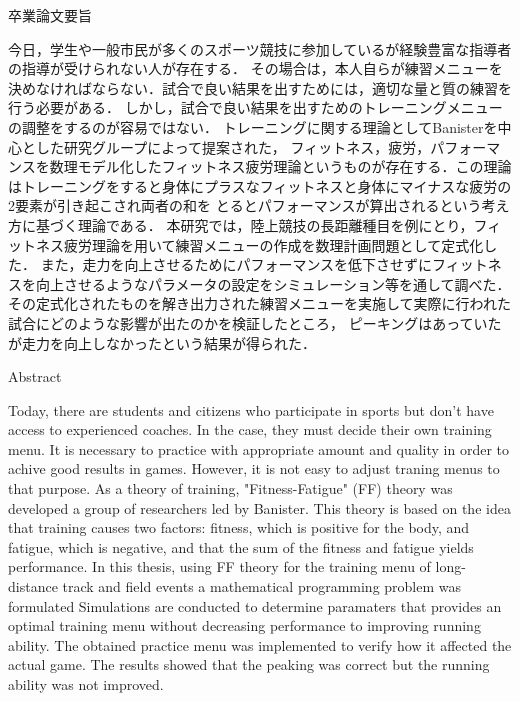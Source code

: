 \documentclass[12pt,fleqn]{jreport}
\begin{document}
\begin{center}
  {\huge 卒業論文要旨}
\end{center}
\vspace{3cm}
\large
今日，学生や一般市民が多くのスポーツ競技に参加しているが経験豊富な指導者の指導が受けられない人が存在する．
その場合は，本人自らが練習メニューを決めなければならない．試合で良い結果を出すためには，適切な量と質の練習を行う必要がある．
しかし，試合で良い結果を出すためのトレーニングメニューの調整をするのが容易ではない．
トレーニングに関する理論としてBanisterを中心とした研究グループによって提案された，
フィットネス，疲労，パフォーマンスを数理モデル化したフィットネス疲労理論というものが存在する．この理論
はトレーニングをすると身体にプラスなフィットネスと身体にマイナスな疲労の2要素が引き起こされ両者の和を
とるとパフォーマンスが算出されるという考え方に基づく理論である．
本研究では，陸上競技の長距離種目を例にとり，フィットネス疲労理論を用いて練習メニューの作成を数理計画問題として定式化した．
また，走力を向上させるためにパフォーマンスを低下させずにフィットネスを向上させるようなパラメータの設定をシミュレーション等を通して調べた．
その定式化されたものを解き出力された練習メニューを実施して実際に行われた試合にどのような影響が出たのかを検証したところ，
ピーキングはあっていたが走力を向上しなかったという結果が得られた．
\newpage
\thispagestyle{empty}

\begin{center}
  {\huge Abstract}
\end{center}
\vspace{3cm}
Today, there are students and citizens who participate in sports but don't have access to experienced coaches.
In the case, they must decide their own training menu.
It is necessary to practice with appropriate amount and quality in order to achive good results in games.
However, it is not easy to adjust traning menus to that purpose.
As a theory of training, "Fitness-Fatigue" (FF) theory was developed a group of researchers led by Banister.
This theory is based on the idea that training causes two factors: fitness, which is positive for the body, and fatigue, which is negative, and that the sum of the fitness and fatigue yields performance.
In this thesis, using FF theory for the training menu of long-distance track and field events a mathematical programming problem was formulated Simulations are conducted to determine paramaters that provides an optimal training menu without decreasing performance to improving running ability.
The obtained practice menu was implemented to verify how it affected the actual game. The results showed that the peaking was correct but the running ability was not improved.
\end{document}
